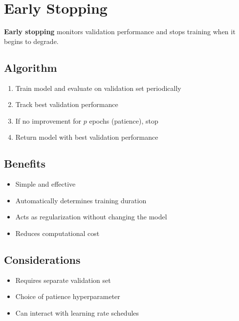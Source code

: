 
\section{Early Stopping}
\label{sec:early-stopping}

\textbf{Early stopping} monitors validation performance and stops training when it begins to degrade.

\subsection{Algorithm}

\begin{enumerate}
    \item Train model and evaluate on validation set periodically
    \item Track best validation performance
    \item If no improvement for $p$ epochs (patience), stop
    \item Return model with best validation performance
\end{enumerate}

\subsection{Benefits}

\begin{itemize}
    \item Simple and effective
    \item Automatically determines training duration
    \item Acts as regularization without changing the model
    \item Reduces computational cost
\end{itemize}

\subsection{Considerations}

\begin{itemize}
    \item Requires separate validation set
    \item Choice of patience hyperparameter
    \item Can interact with learning rate schedules
\end{itemize}

